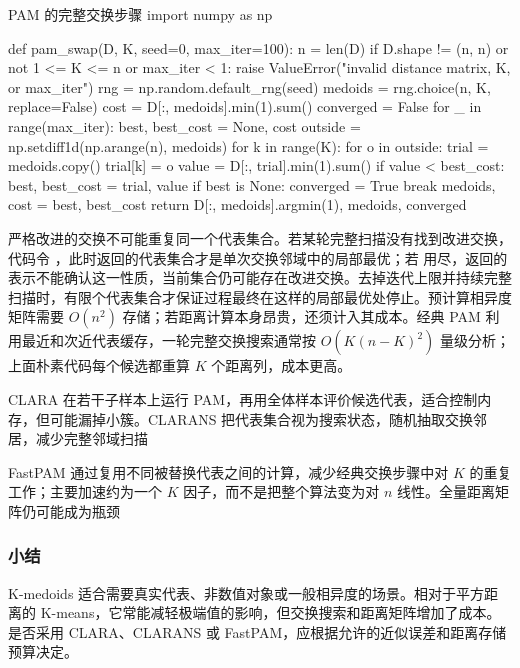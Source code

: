 \begin{codeblock}[language=Python,label={code:clustering-pam}]{PAM 的完整交换步骤}
import numpy as np

def pam_swap(D, K, seed=0, max_iter=100):
    n = len(D)
    if D.shape != (n, n) or not 1 <= K <= n or max_iter < 1:
        raise ValueError("invalid distance matrix, K, or max_iter")
    rng = np.random.default_rng(seed)
    medoids = rng.choice(n, K, replace=False)
    cost = D[:, medoids].min(1).sum()
    converged = False
    for _ in range(max_iter):
        best, best_cost = None, cost
        outside = np.setdiff1d(np.arange(n), medoids)
        for k in range(K):
            for o in outside:
                trial = medoids.copy()
                trial[k] = o
                value = D[:, trial].min(1).sum()
                if value < best_cost:
                    best, best_cost = trial, value
        if best is None:
            converged = True
            break
        medoids, cost = best, best_cost
    return D[:, medoids].argmin(1), medoids, converged
\end{codeblock}

严格改进的交换不可能重复同一个代表集合。若某轮完整扫描没有找到改进交换，代码令 ，此时返回的代表集合才是单次交换邻域中的局部最优；若  用尽，返回的  表示不能确认这一性质，当前集合仍可能存在改进交换。去掉迭代上限并持续完整扫描时，有限个代表集合才保证过程最终在这样的局部最优处停止。预计算相异度矩阵需要 $O(n^2)$ 存储；若距离计算本身昂贵，还须计入其成本。经典 PAM 利用最近和次近代表缓存，一轮完整交换搜索通常按 $O(K(n-K)^2)$ 量级分析；上面朴素代码每个候选都重算 $K$ 个距离列，成本更高。

CLARA 在若干子样本上运行 PAM，再用全体样本评价候选代表，适合控制内存，但可能漏掉小簇。CLARANS 把代表集合视为搜索状态，随机抽取交换邻居，减少完整邻域扫描

FastPAM 通过复用不同被替换代表之间的计算，减少经典交换步骤中对 $K$ 的重复工作；主要加速约为一个 $K$ 因子，而不是把整个算法变为对 $n$ 线性。全量距离矩阵仍可能成为瓶颈

\subsubsection{小结}

K-medoids 适合需要真实代表、非数值对象或一般相异度的场景。相对于平方距离的 K-means，它常能减轻极端值的影响，但交换搜索和距离矩阵增加了成本。是否采用 CLARA、CLARANS 或 FastPAM，应根据允许的近似误差和距离存储预算决定。


